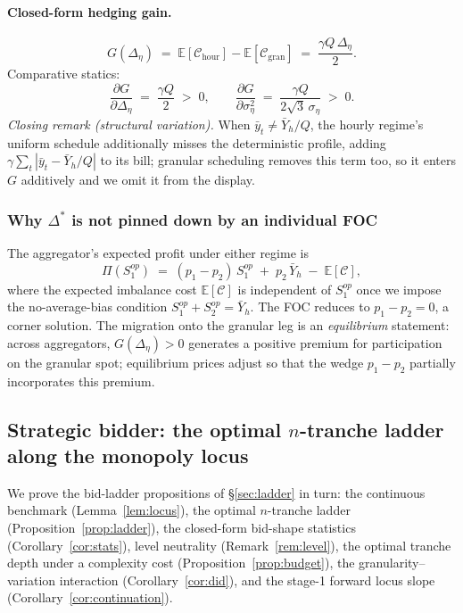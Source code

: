 \documentclass[11pt,a4paper]{article}
\theoremstyle{definition}
\theoremstyle{remark}
\theoremstyle{plain}
\begin{document}
\paragraph{Closed-form hedging gain.}
\begin{equation}
\boxed{\;G(\Delta_\eta) \;=\; \mathbb{E}[\mathcal{C}_{\text{hour}}] - \mathbb{E}[\mathcal{C}_{\text{gran}}] \;=\; \dfrac{\gamma Q \, \Delta_\eta}{2}.\;}
\label{eq:agg-gain}
\end{equation}
Comparative statics:
\[
\dfrac{\partial G}{\partial \Delta_\eta} \;=\; \dfrac{\gamma Q}{2} \;>\; 0, \qquad \dfrac{\partial G}{\partial \sigma_\eta^2} \;=\; \dfrac{\gamma Q}{2\sqrt{3}\,\sigma_\eta} \;>\; 0.
\]
\emph{Closing remark (structural variation).} When $\bar y_t \neq \bar Y_h/Q$, the hourly regime's uniform schedule additionally misses the deterministic profile, adding $\gamma \sum_t |\bar y_t - \bar Y_h/Q|$ to its bill; granular scheduling removes this term too, so it enters $G$ additively and we omit it from the display.

\subsubsection{Why $\Delta^*$ is not pinned down by an individual FOC}\label{sec:aggregator-app:shift}
The aggregator's expected profit under either regime is
\[
\Pi(S_1^{op}) \;=\; (p_1 - p_2)\, S_1^{op} \;+\; p_2 \, \bar Y_h \;-\; \mathbb{E}[\mathcal{C}],
\]
where the expected imbalance cost $\mathbb{E}[\mathcal{C}]$ is independent of $S_1^{op}$ once we impose the no-average-bias condition $S_1^{op} + S_2^{op} = \bar Y_h$. The FOC reduces to $p_1 - p_2 = 0$, a corner solution. The migration onto the granular leg is an \emph{equilibrium} statement: across aggregators, $G(\Delta_\eta) > 0$ generates a positive premium for participation on the granular spot; equilibrium prices adjust so that the wedge $p_1 - p_2$ partially incorporates this premium.

\subsection{Strategic bidder: the optimal $n$-tranche ladder along the monopoly locus}\label{sec:tranche-app}

We prove the bid-ladder propositions of \S\ref{sec:ladder} in turn: the continuous benchmark (Lemma~\ref{lem:locus}), the optimal $n$-tranche ladder (Proposition~\ref{prop:ladder}), the closed-form bid-shape statistics (Corollary~\ref{cor:stats}), level neutrality (Remark~\ref{rem:level}), the optimal tranche depth under a complexity cost (Proposition~\ref{prop:budget}), the granularity--variation interaction (Corollary~\ref{cor:did}), and the stage-1 forward locus slope (Corollary~\ref{cor:continuation}).
\end{document}

